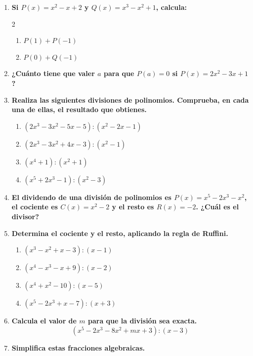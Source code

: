 \documentclass[a4paper,12pt]{article}
\begin{document}
\begin{enumerate}
    \item \textbf{Si $P(x) = x^2 - x + 2$ y $Q(x) = x^3 - x^2 + 1$, calcula:}
    \begin{multicols}{2}
    \begin{enumerate}[label=\textbf{\alph*)}]
        \item $P(1) + P(-1)$
        \item $P(0) + Q(-1)$
    \end{enumerate}
    \end{multicols}


    \item \textbf{¿Cuánto tiene que valer $a$ para que $P(a) = 0$ si $P(x) = 2x^2 - 3x + 1$?}
    \item \textbf{Realiza las siguientes divisiones de polinomios. Comprueba, en cada una de ellas, el resultado que obtienes.}
        \begin{enumerate}[label=\textbf{\alph*)}]
            \item $(2x^3 - 3x^2 - 5x - 5) : (x^2 - 2x - 1)$
            \item $(2x^3 - 3x^2 + 4x - 3) : (x^2 - 1)$
            \item $(x^4 + 1) : (x^2 + 1)$
            \item $(x^5 + 2x^3 - 1) : (x^2 - 3)$
        \end{enumerate}
    \item \textbf{El dividendo de una división de polinomios es $P(x) = x^5 - 2x^3 - x^2$, el cociente es $C(x) = x^2 - 2$ y el resto es $R(x) = -2$. ¿Cuál es el divisor?}
    \item \textbf{Determina el cociente y el resto, aplicando la regla de Ruffini.}
        \begin{enumerate}[label=\textbf{\alph*)}]
            \item $(x^3 - x^2 + x - 3) : (x - 1)$
            \item $(x^4 - x^3 - x + 9) : (x - 2)$
            \item $(x^4 + x^2 - 10) : (x - 5)$
            \item $(x^5 - 2x^3 + x - 7) : (x + 3)$
        \end{enumerate}
    \item \textbf{Calcula el valor de $m$ para que la división sea exacta.}
        \[
        (x^5 - 2x^3 - 8x^2 + mx + 3) : (x - 3)
        \]
    \item \textbf{Simplifica estas fracciones algebraicas.}


\end{enumerate}
\end{document}
